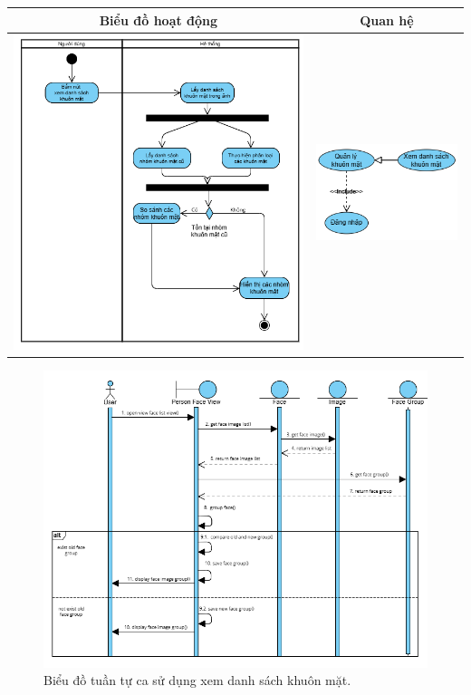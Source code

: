 \noindent 
\begin{tabular}{| c | c |}
    \hline
    \textbf{Biểu đồ hoạt động} & \textbf{Quan hệ} \\ 
    \hline
    \includegraphics[width=0.6\linewidth]{figures/c3/3-3-10-activity-diagram.png} 
    &  
    \includegraphics[width=0.35\linewidth]{figures/c3/3-3-10-relationship.png} \\ 
    \hline
\end{tabular}

\begin{figure}[H]
    \centering  
    \includegraphics[width=1.1\textwidth]{figures/c3/3-3-10-sequence-diagram.png}
    \caption{Biểu đồ tuần tự ca sử dụng xem danh sách khuôn mặt.}
    \label{fig:3-3-10-sequence-diagram}
\end{figure}